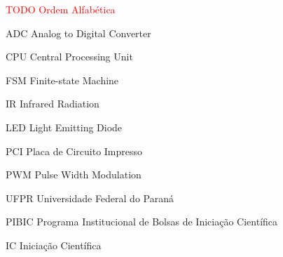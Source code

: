 \begin{siglas}
    \item[\textcolor{red}{TODO}]\textcolor{red}{Ordem Alfabética}
    \item[ADC] Analog to Digital Converter
    \item[CPU] Central Processing Unit
    \item[FSM] Finite-state Machine
    \item[IR] Infrared Radiation
    \item[LED] Light Emitting Diode
    \item[PCI] Placa de Circuito Impresso
    \item[PWM] Pulse Width Modulation
    \item[UFPR] Universidade Federal do Paraná
    \item[PIBIC] Programa Institucional de Bolsas de Iniciação Científica
    \item[IC] Iniciação Científica
\end{siglas}

